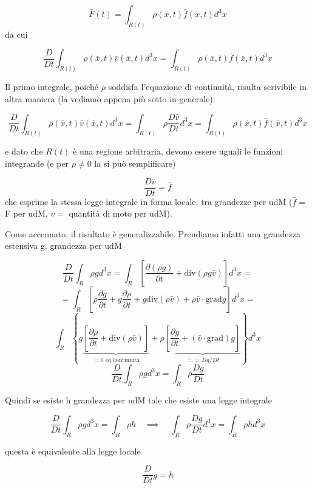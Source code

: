 \documentclass[a4paper,11pt]{report}
\newcommand{\defeq}{\overset{\cdot}{=}}
\newcommand{\x}{\bar{x}}
\newcommand{\vel}{\bar{v}}
\begin{document}
		$$
		\bar{F}(t) = \int_{R(t)} \rho(\x,t)\bar{f}(\x,t)d^3x 
		$$
		da cui
		
		$$
		\dfrac{D}{Dt}\int_{R(t)}\rho(\x,t)\vel(\x,t)d^3x = \int_{R(t)} \rho(\x,t)\bar{f}(\x,t)d^3x
		$$
		
		Il primo integrale, poiché $\rho$ soddisfa l'equazione di continuità, risulta scrivibile in altra maniera (la vediamo appena più sotto in generale):
		
		$$
		\dfrac{D}{Dt}\int_{R(t)}\rho(\x,t)\vel(\x,t)d^3x =
		\int_{R(t)}\rho \dfrac{D\vel}{Dt}d^3x
		= \int_{R(t)} \rho(\x,t)\bar{f}(\x,t)d^3x
		$$
		
		e dato che $R(t)$ è una regione arbitraria, devono essere uguali le funzioni integrande (e per $\rho \neq 0$ la si può semplificare) 
		
		$$
		\dfrac{D\vel}{Dt}= \bar{f}
		$$
		che esprime la stessa legge integrale in forma locale, tra grandezze per udM ($\bar{f}=$ F per udM, $\vel=$ quantità di moto per udM).
		
		Come accennato, il risultato è generalizzabile. Prendiamo infatti una grandezza estensiva g, grandezza per udM
		
		$$
		\dfrac{D}{Dt}\int_{R}\rho g d^3x = \int_{R} \left[\dfrac{\partial (\rho g)}{\partial t} + \mathrm{ div}(\rho g \vel)\right]d^3x=
		$$
		$$
		=\int_{R}\left[\rho\dfrac{\partial g}{\partial t} + g  \dfrac{\partial \rho}{\partial t} + g\mathrm{ div}(\rho\vel) + \rho \vel \cdot \mathrm{grad} g\right] d^3x=
		$$
		$$
		\int_{R} \left\{g\underset{=0 \textrm{ eq continuità}}{\underbrace{\left[\dfrac{\partial \rho}{\partial t} + \mathrm{ div}(\rho\vel)\right]}} +
		\rho\underset{\defeq =  Dg/Dt}{ \underbrace{\left[\dfrac{\partial g}{\partial t} + \left(\vel \cdot \mathrm{grad}\right)g\right]}} \right\}d^3x
		$$
		\begin{equation}
			\dfrac{D}{Dt}\int_{R}\rho g d^3x = \int_{R} \rho \dfrac{Dg}{D t}
		\end{equation}
		
		Quindi se esiste h grandezza per udM tale che esiste una legge integrale
		
		$$
		\dfrac{D}{Dt}\int_{R} \rho g d^3x = \int_{R} \rho h \quad \implies \quad \int_{R}\rho \dfrac{Dg}{Dt}d^3x = \int_{R} \rho h d^3x
		$$
		
		questa è equivalente alla legge locale
		
		\begin{equation}
			\dfrac{D}{Dt}g = h
		\end{equation}
		
\end{document}
